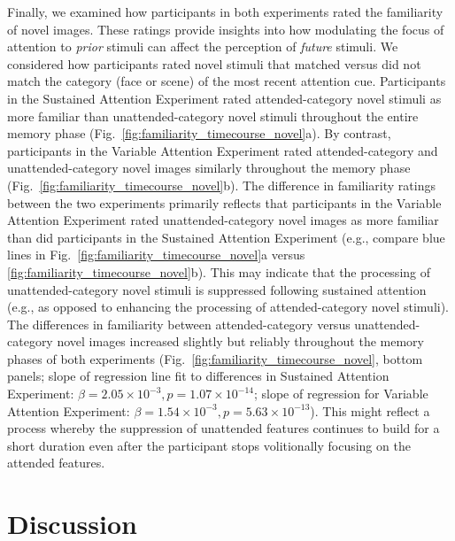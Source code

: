 \documentclass[english]{article}
\begin{document}
Finally, we examined how participants in both experiments rated the familiarity
of novel images. These ratings provide insights into how modulating the focus
of attention to \textit{prior} stimuli can affect the perception of
\textit{future} stimuli. We considered how participants rated novel stimuli
that matched versus did not match the category (face or scene) of the most
recent attention cue. Participants in the Sustained Attention Experiment rated
attended-category novel stimuli as more familiar than unattended-category novel
stimuli throughout the entire memory phase
(Fig.~\ref{fig:familiarity_timecourse_novel}a). By contrast, participants in
the Variable Attention Experiment rated attended-category and
unattended-category novel images similarly throughout the memory phase
(Fig.~\ref{fig:familiarity_timecourse_novel}b). The difference in familiarity
ratings between the two experiments primarily reflects that participants in the
Variable Attention Experiment rated unattended-category novel images as more
familiar than did participants in the Sustained Attention Experiment (e.g.,
compare blue lines in Fig.~\ref{fig:familiarity_timecourse_novel}a versus
\ref{fig:familiarity_timecourse_novel}b). This may indicate that the processing
of unattended-category novel stimuli is suppressed following sustained
attention (e.g., as opposed to enhancing the processing of attended-category
novel stimuli). The differences in familiarity between attended-category versus
unattended-category novel images increased slightly but reliably throughout the
memory phases of both experiments (Fig.~\ref{fig:familiarity_timecourse_novel},
bottom panels; slope of regression line fit to differences in Sustained
Attention Experiment: $\beta = 2.05 \times 10^{-3}, p = 1.07 \times 10^{-14} $;
slope of regression for Variable Attention Experiment: $\beta = 1.54 \times
10^{-3}, p = 5.63 \times 10^{-13} $). This might reflect a process whereby the
suppression of unattended features continues to build for a short duration even
after the participant stops volitionally focusing on the attended features.


\section*{Discussion}
\end{document}
